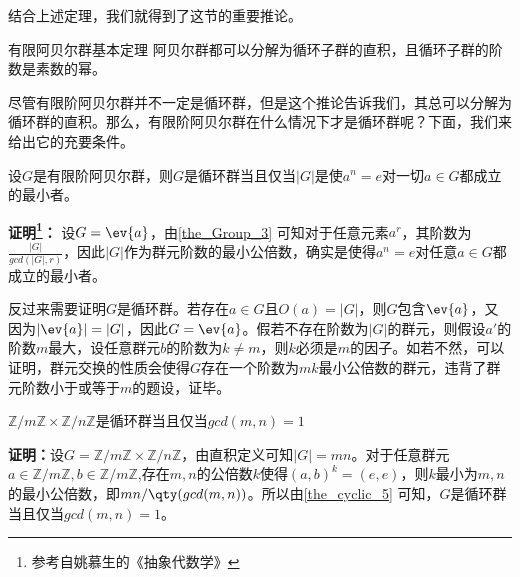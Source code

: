 结合上述定理，我们就得到了这节的重要推论。

\begin{corollary}{有限阿贝尔群基本定理}
阿贝尔群都可以分解为循环子群的直积，且循环子群的阶数是素数的幂。
\end{corollary}
尽管有限阶阿贝尔群并不一定是循环群，但是这个推论告诉我们，其总可以分解为循环群的直积。那么，有限阶阿贝尔群在什么情况下才是循环群呢？下面，我们来给出它的充要条件。
\begin{theorem}{}\label{the_cyclic_5}
设$G$是有限阶阿贝尔群，则$G$是循环群当且仅当$|G|$是使$a^n=e$对一切$a\in G$都成立的最小者。
\end{theorem}

\textbf{证明\footnote{参考自姚慕生的《抽象代数学》}：}
设$G=\ev{a}$，由\autoref{the_Group_3} 可知对于任意元素$a^r$，其阶数为$\frac{|G|}{gcd(|G|,r)}$，因此$|G|$作为群元阶数的最小公倍数，确实是使得$a^n=e$对任意$a\in G$都成立的最小者。

反过来需要证明$G$是循环群。若存在$a\in G$且$O(a)=|G|$，则$G$包含$\ev{a}$，又因为$|\ev{a}|=|G|$，因此$G=\ev{a}$。假若不存在阶数为$|G|$的群元，则假设$a'$的阶数$m$最大，设任意群元$b$的阶数为$k\neq m$，则$k$必须是$m$的因子。如若不然，可以证明，群元交换的性质会使得$G$存在一个阶数为$mk$最小公倍数的群元，违背了群元阶数小于或等于$m$的题设，证毕。

\begin{corollary}{}
$\mathbb{Z} / m \mathbb{Z} \times \mathbb{Z} / n \mathbb{Z}$是循环群当且仅当$gcd(m,n)=1$
\end{corollary}
\textbf{证明：}设$G=\mathbb{Z} / m \mathbb{Z} \times \mathbb{Z} / n \mathbb{Z}$，由直积定义可知$|G|=mn$。对于任意群元$a\in \mathbb{Z} / m \mathbb{Z},b\in \mathbb{Z} / m \mathbb{Z}$,存在$m,n$的公倍数$k$使得$(a,b)^k=(e,e)$，则$k$最小为$m,n$的最小公倍数，即$mn/\qty(gcd(m,n))$。所以由\autoref{the_cyclic_5}  可知，$G$是循环群当且仅当$gcd(m,n)=1$。